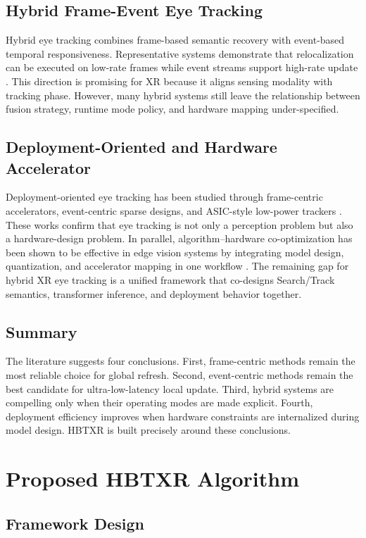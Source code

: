 \documentclass[journal]{IEEEtran}
\begin{document}
\subsection{Hybrid Frame-Event Eye Tracking}
Hybrid eye tracking combines frame-based semantic recovery with event-based temporal responsiveness. Representative systems demonstrate that relocalization can be executed on low-rate frames while event streams support high-rate update \cite{ref7}. This direction is promising for XR because it aligns sensing modality with tracking phase. However, many hybrid systems still leave the relationship between fusion strategy, runtime mode policy, and hardware mapping under-specified.

\subsection{Deployment-Oriented and Hardware Accelerator}
Deployment-oriented eye tracking has been studied through frame-centric accelerators, event-centric sparse designs, and ASIC-style low-power trackers \cite{ref8,ref9,ref10}. These works confirm that eye tracking is not only a perception problem but also a hardware-design problem. In parallel, algorithm--hardware co-optimization has been shown to be effective in edge vision systems by integrating model design, quantization, and accelerator mapping in one workflow \cite{ref12}. The remaining gap for hybrid XR eye tracking is a unified framework that co-designs Search/Track semantics, transformer inference, and deployment behavior together.

\subsection{Summary}
The literature suggests four conclusions. First, frame-centric methods remain the most reliable choice for global refresh. Second, event-centric methods remain the best candidate for ultra-low-latency local update. Third, hybrid systems are compelling only when their operating modes are made explicit. Fourth, deployment efficiency improves when hardware constraints are internalized during model design. HBTXR is built precisely around these conclusions.

\section{Proposed HBTXR Algorithm}
\subsection{Framework Design}
\end{document}
